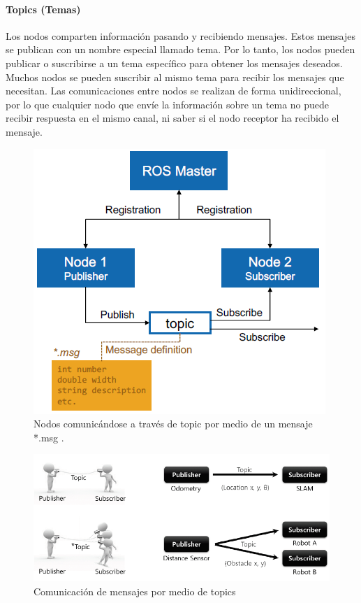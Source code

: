             \paragraph{Topics (Temas)}
                Los nodos comparten información pasando y recibiendo mensajes. Estos mensajes se publican con un nombre especial llamado tema. Por lo tanto, los nodos pueden publicar o suscribirse a un tema específico para obtener los mensajes deseados. Muchos nodos se pueden suscribir al mismo tema para recibir los mensajes que necesitan. Las comunicaciones entre nodos se realizan de forma unidireccional, por lo que cualquier nodo que envíe la información sobre un tema no puede recibir respuesta en el mismo canal, ni saber si el nodo receptor ha recibido el mensaje.
            \begin{figure}[htb]
                \centering
                \includegraphics[width=0.68\linewidth]{Main/Chapter3/Images3/n_s_a_7.png}
                \caption{Nodos comunicándose a través de topic por medio de un mensaje *.msg \cite{rosmaster_diagram}.}
                \label{f:Cap3_conceptos_7}
            \end{figure} 
            \begin{figure}[htb]
                \centering
                \includegraphics[width=0.92\linewidth]{Main/Chapter3/Images3/n_s_a_8.PNG}
                \caption{Comunicación de mensajes por medio de topics \cite{ROS_BOOK_1}}
                \label{f:Cap3_conceptos_8}
            \end{figure} 


